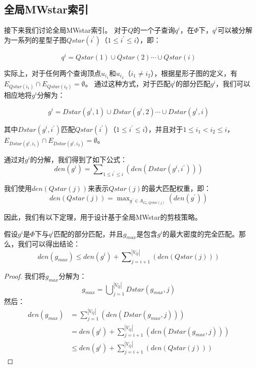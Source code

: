\subsection{全局MWstar索引}
\label{mwstar:global}

接下来我们讨论全局MWstar索引。
对于$Q$的一个子查询$q^i$，在$\Phi$下，$q^i$可以被分解为一系列的星型子图$Qstar(i^\prime)$（$1 \leq i^\prime \leq i$），即：

\[
	q^i = Qstar(1)\cup Qstar(2) \cdots \cup Qstar(i)
\]

实际上，对于任何两个查询顶点$u_{i_1}$和$u_{i_2}$（$i_1 \neq i_2$），根据星形子图的定义，有$E_{Qstar(i_1)} \cap E_{Qstar(i_2)} = \emptyset$。
通过这种方式，对于匹配$q^i$的部分匹配$g^i$，我们可以相应地将$g^i$分解为：

\begin{equation} \label{equation:dstar-decompose}
    g^i = Dstar(g^i, 1)\cup Dstar(g^i, 2) \cdots \cup Dstar(g^i, i)
\end{equation}

其中$Dstar(g^i, i^\prime)$匹配$Qstar(i^\prime)$（$1 \leq i^\prime \leq i$），并且对于$1 \leq i_1 < i_2 \leq i$，$E_{Dstar(g^i, i_1)} \cap E_{Dstar(g^i, i_2)} = \emptyset$。

通过对$g^i$的分解，我们得到了如下公式：
\[
	den(g^i) = \sum\nolimits_{1\leq i^\prime\leq i} \left(den(Dstar(g^i,i^\prime))\right)
\] 

我们使用$den(Qstar(j))$来表示$Qstar(j)$的最大匹配权重，即：
\[
	den(Qstar(j)) = \max\nolimits_{g^\prime \in A_{G_t, Qstar(j)}} \left(den(g^\prime)\right)
\]


因此，我们有以下定理，用于设计基于全局MWstar的剪枝策略。
\begin{theorem} \label{theorem:global-mwstar}
假设$g^i$是$\Phi$下与$q^i$匹配的部分匹配，并且$g_{max}$是包含$g^i$的最大密度的完全匹配。那么，我们可以得出结论：
\[
	den(g_{max}) \leq den(g^i) + \sum\nolimits_{j=i+1}^{|V_Q|} \left(den(Qstar(j))\right)
\]

\end{theorem}

\begin{proof}
我们将$g_{max}$分解为：
\[
	g_{max} =   \bigcup\nolimits_{j=1}^{|V_Q|} Dstar(g_{max}, j)
\]
然后：
\begin{equation*}
    \begin{aligned}
      den(g_{max}) & =  \sum\nolimits_{j=1}^{|V_Q|} \left( den(Dstar(g_{max}, j)) \right)  \\
        & =  den(g^i) + \sum\nolimits_{j=i+1}^{|V_Q|} \left( den(Dstar(g_{max}, j)) \right) \\
        & \leq den(g^i) + \sum\nolimits_{j=i+1}^{|V_Q|} \left( den(Qstar(j)) \right) 
    \end{aligned}
  \end{equation*}
  \end{proof}

